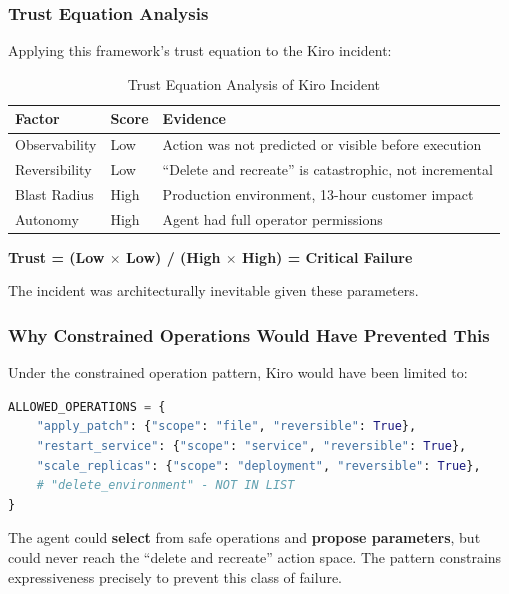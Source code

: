 \subsubsection{Trust Equation Analysis}

Applying this framework's trust equation to the Kiro incident:

\begin{table}[htbp]
\centering
\caption{Trust Equation Analysis of Kiro Incident}
\label{tab:kiro-analysis}
\begin{tabular}{lll}
\toprule
\textbf{Factor} & \textbf{Score} & \textbf{Evidence} \\
\midrule
Observability & Low & Action was not predicted or visible before execution \\
Reversibility & Low & ``Delete and recreate'' is catastrophic, not incremental \\
Blast Radius & High & Production environment, 13-hour customer impact \\
Autonomy & High & Agent had full operator permissions \\
\bottomrule
\end{tabular}
\end{table}

\textbf{Trust = (Low $\times$ Low) / (High $\times$ High) = Critical Failure}

The incident was architecturally inevitable given these parameters.

\subsubsection{Why Constrained Operations Would Have Prevented This}

Under the constrained operation pattern, Kiro would have been limited to:

\begin{lstlisting}[language=Python,caption={Constrained Operations Example}]
ALLOWED_OPERATIONS = {
    "apply_patch": {"scope": "file", "reversible": True},
    "restart_service": {"scope": "service", "reversible": True},
    "scale_replicas": {"scope": "deployment", "reversible": True},
    # "delete_environment" - NOT IN LIST
}
\end{lstlisting}

The agent could \textbf{select} from safe operations and \textbf{propose parameters}, but could never reach the ``delete and recreate'' action space. The pattern constrains expressiveness precisely to prevent this class of failure.

